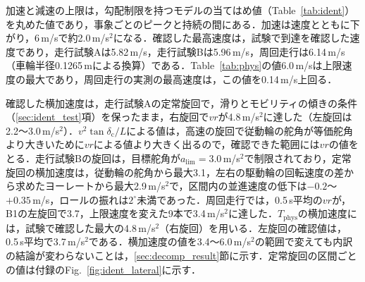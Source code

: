 加速と減速の上限は，勾配制限を持つモデルの当てはめ値（Table~\ref{tab:ident}）を丸めた値であり，事象ごとのピークと持続の間にある．加速は速度とともに下がり，6\,m/sで約2.0\,m/s$^2$になる．確認した最高速度は，試験で到達を確認した速度であり，走行試験Aは5.82\,m/s，走行試験Bは5.96\,m/s，周回走行は6.14\,m/s（車輪半径0.1265\,mによる換算）である．Table~\ref{tab:phys}の値6.0\,m/sは上限速度の最大であり，周回走行の実測の最高速度は，この値を0.14\,m/s上回る．

確認した横加速度は，走行試験Aの定常旋回で，滑りとモビリティの傾きの条件（\ref{sec:ident_test}項）を保ったまま，右旋回で$vr$が4.8\,m/s$^2$に達した（左旋回は2.2〜3.0\,m/s$^2$）．$v^2\tan\delta_{\mathrm{c}}/L$による値は，高速の旋回で従動輪の舵角が等価舵角より大きいために$vr$による値より大きく出るので，確認できた範囲には$vr$の値をとる．走行試験Bの旋回は，目標舵角が$a_{\mathrm{lim}}=3.0$\,m/s$^2$で制限されており，定常旋回の横加速度は，従動輪の舵角から最大3.1，左右の駆動輪の回転速度の差から求めたヨーレートから最大2.9\,m/s$^2$で，区間内の並進速度の低下は$-0.2$〜$+0.35$\,m/s，ロールの振れは$2^\circ$未満であった．周回走行では，0.5\,s平均の$vr$が，B1の左旋回で3.7，上限速度を変えた9本で3.4\,m/s$^2$に達した．$T_{\mathrm{phys}}$の横加速度には，試験で確認した最大の4.8\,m/s$^2$（右旋回）を用いる．左旋回の確認値は，0.5\,s平均で3.7\,m/s$^2$である．横加速度の値を3.4〜6.0\,m/s$^2$の範囲で変えても内訳の結論が変わらないことは，\ref{sec:decomp_result}節に示す．定常旋回の区間ごとの値は付録のFig.~\ref{fig:ident_lateral}に示す．

